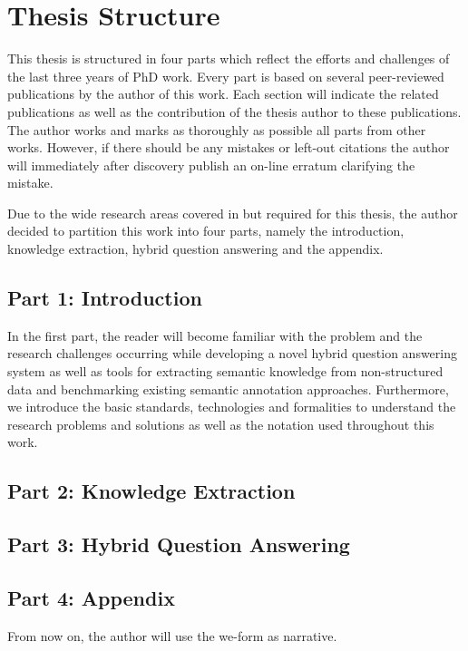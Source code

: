 \section{Thesis Structure}

This thesis is structured in four parts which reflect the efforts and challenges of the last three years of PhD work. 
Every part is based on several peer-reviewed publications by the author of this work. 
Each section will indicate the related publications as well as the contribution of the thesis author to these publications. 
The author works and marks as thoroughly as possible all parts from other works. 
However, if there should be any mistakes or left-out citations the author will immediately after discovery publish an on-line erratum clarifying the mistake. 

Due to the wide research areas covered in but required for this thesis, the author decided to partition this work into four parts, namely the introduction, knowledge extraction, hybrid question answering and the appendix. 

\subsection{Part 1: Introduction}
In the first part, the reader will become familiar with the problem and the research challenges occurring while developing a novel hybrid question answering system as well as tools for extracting semantic knowledge from non-structured data and benchmarking existing semantic annotation approaches.
Furthermore, we introduce the basic standards, technologies and formalities to understand the research problems and solutions as well as the notation used throughout this work.

\subsection{Part 2: Knowledge Extraction}



\subsection{Part 3: Hybrid Question Answering}

\subsection{Part 4: Appendix}

From now on, the author will use the we-form as narrative.

